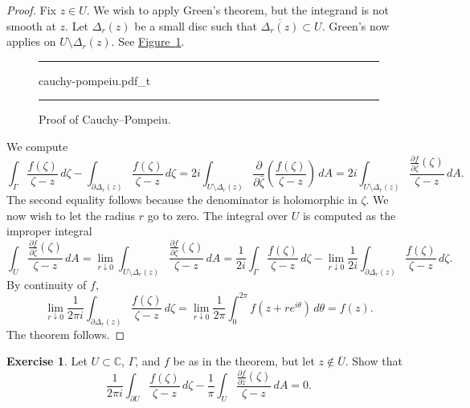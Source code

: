 \documentclass[12pt,openany]{book}
\newcommand{\C}{{\mathbb{C}}}
\theoremstyle{plain}
\theoremstyle{remark}
\theoremstyle{definition}
\newenvironment{exbox}{%
    \def\FrameCommand{\vrule width 1pt \relax\hspace{10pt}}%
    \MakeFramed{\advance\hsize-\width\FrameRestore}%
}{%
    \endMakeFramed
}
\newenvironment{myfig}{%
\begin{figure}[h!t]
\noindent\rule{\textwidth}{0.4pt}\vspace{12pt}\par\centering}%
{\par\noindent\rule{\textwidth}{0.4pt}
\end{figure}}
\theoremstyle{exercise}
\newtheorem{exercise}{Exercise}[section]
\theoremstyle{example}
\newcommand{\figureref}[1]{\hyperref[#1]{Figure~\ref*{#1}}}
\begin{document}
\begin{proof}
Fix $z \in U$.  We wish to apply Green's theorem,
but the integrand is not smooth at $z$.
Let $\Delta_r(z)$ be a small disc such that
$\overline{\Delta_r(z)} \subset U$.  Green's now applies on $U \setminus \Delta_r(z)$.  See
\figureref{fig:cauchypompeiu}.
\begin{myfig}
{cauchy-pompeiu.pdf_t}
\caption{Proof of Cauchy--Pompeiu.\label{fig:cauchypompeiu}}
\end{myfig}
We compute
\begin{equation*}
\int_{\Gamma} \frac{f(\zeta)}{\zeta-z}\,  d\zeta - 
\int_{\partial \Delta_r(z)} \frac{f(\zeta)}{\zeta-z}\,  d\zeta
=
2i
\int_{U \setminus \Delta_r(z)} \frac{\partial}{\partial \bar{\zeta}} \left(
\frac{f(\zeta)}{\zeta-z} \right) \, dA
=
2i
\int_{U \setminus \Delta_r(z)}  
\frac{\frac{\partial f}{\partial \bar{\zeta}}(\zeta)}{\zeta-z} \, dA .
\end{equation*}
The second equality follows because the denominator is holomorphic in
$\zeta$.
We now wish to let the radius $r$ go to zero.
The integral over $U$ is computed as the improper integral
\begin{equation*}
\int_{U} \frac{\frac{\partial f}{\partial
\bar{\zeta}}(\zeta)}{\zeta-z} \, dA
=
\lim_{r \downarrow 0}
\int_{U \setminus \Delta_r(z)} \frac{\frac{\partial f}{\partial
\bar{\zeta}}(\zeta)}{\zeta-z} \, dA
=
\frac{1}{2i}
\int_{\Gamma} \frac{f(\zeta)}{\zeta-z}\,  d\zeta
- 
\lim_{r \downarrow 0}
\frac{1}{2i}
\int_{\partial \Delta_r(z)} \frac{f(\zeta)}{\zeta-z}\,  d\zeta .
\end{equation*}
By continuity of $f$,
\begin{equation*}
\lim_{r \downarrow 0}
\frac{1}{2\pi i}
\int_{\partial \Delta_r(z)} \frac{f(\zeta)}{\zeta-z}\,  d\zeta
=
\lim_{r \downarrow 0}
\frac{1}{2\pi}
\int_0^{2\pi} f(z + r e^{i\theta})\, d\theta
=
f(z) .
\end{equation*}
The theorem follows.
\end{proof}

\begin{exbox}
\begin{exercise}
Let $U \subset \C$, $\Gamma$, and $f$ be as in the theorem, but let $z \notin
\overline{U}$.  Show that
\begin{equation*}
\frac{1}{2\pi i}
\int_{\partial U}
\frac{f(\zeta)}{\zeta-z}
\,
d \zeta
-
\frac{1}{\pi}
\int_{U}
\frac{\frac{\partial f}{\partial \bar{z}}(\zeta)}{\zeta-z}
\,
dA
= 0 .
\end{equation*}
\end{exercise}
\end{exbox}
\end{document}
